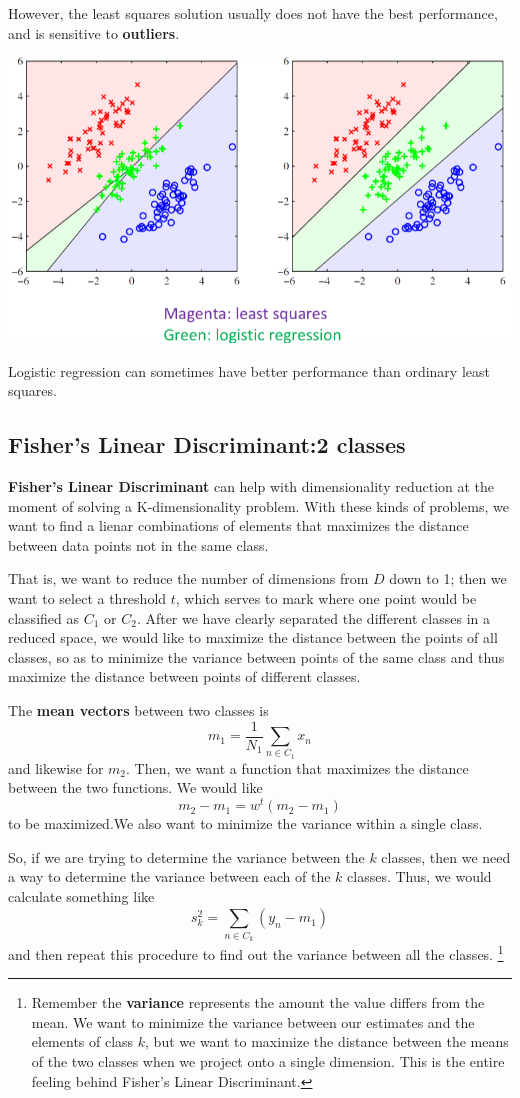 \documentclass{tufte-handout}
\begin{document}
	However, the least squares solution usually does not have the best performance, and is 
	sensitive to \textbf{outliers}.
	\begin{marginfigure}
			\includegraphics[width=\linewidth]{ls_not_good}
			\caption{Logistic regression can sometimes have better performance than
				ordinary least squares.}
	\end{marginfigure}
\subsection{Fisher's Linear Discriminant:2 classes}
	\textbf{Fisher's Linear Discriminant} can help with dimensionality reduction at the moment
	of solving a K-dimensionality problem. With these kinds of problems, we want to find a lienar
	combinations of elements that maximizes the distance between data points not in the same class.

	That is, we want to reduce the number of dimensions from $D$ down to 1; then we want to select 
	a threshold $t$, which serves to mark where one point would be classified as $C_{1}$ or $C_{2}$.
	After we have clearly separated the different classes in a reduced space, we would like to maximize
	the distance between the points of all classes, so as to minimize the variance between points of the 
	same class and thus maximize the distance between points of different classes.

	The \textbf{mean vectors} between two classes is 
	\[ m_{1} = \frac{1}{N_{1}} \sum_{n\in C_{1}}^{}x_{n}\]
	and likewise for $m_{2}$. Then, we want a function that maximizes the distance between the two
	functions. We would like  
	\[ m_{2} - m_{1} = w^{t}(m_{2} - m_{1})\]
	to be maximized.We also want to minimize the variance within a single class.

	So, if we are trying to determine the variance between the $k$ classes, then we need a way to 
	determine the variance between each of the $k$ classes. Thus, we would calculate something like
	\[s_{k}^{2} = \sum_{n\in C_{k}}^{}(y_{n} - m_{1})\]
	and then repeat this procedure to find out the variance between all the classes.
	\footnote{Remember the \textbf{variance} represents the amount the value differs from the mean. We
	want to minimize the variance between our estimates and the elements of class $k$, but we want to  
	maximize the distance between the means of the two classes when we project onto a single dimension.
	This is the entire feeling behind Fisher's Linear Discriminant.}
\end{document}
